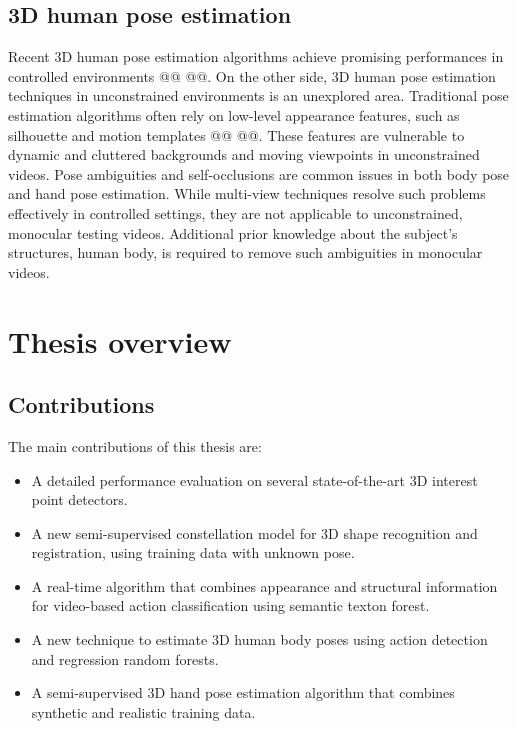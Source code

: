 \subsection{3D human pose estimation} 


Recent 3D human pose estimation algorithms achieve promising performances in controlled environments @@ @@. On the other side, 3D human pose estimation techniques in unconstrained environments is an unexplored area.       
Traditional pose estimation algorithms often rely on low-level appearance features, such as silhouette and motion templates @@ @@. These features are vulnerable to dynamic and cluttered backgrounds and moving viewpoints in unconstrained videos. 
Pose ambiguities and self-occlusions are common issues in both body pose and hand pose estimation. While multi-view techniques resolve such problems effectively in controlled settings, they are not applicable to unconstrained, monocular testing videos. Additional prior knowledge about the subject's structures, \eg human body, is required to remove such ambiguities in monocular videos. 

\section{Thesis overview}

\subsection{Contributions}

The main contributions of this thesis are:
\begin{itemize}
	\item A detailed performance evaluation on several state-of-the-art 3D interest point detectors.
	\item A new semi-supervised constellation model for 3D shape recognition and registration, using training data with unknown pose. 
	\item A real-time algorithm that combines appearance and structural information for video-based action classification using semantic texton forest. 
	\item A new technique to estimate 3D human body poses using action detection and regression random forests. 
	\item A semi-supervised 3D hand pose estimation algorithm that combines synthetic and realistic training data. 
\end{itemize}

